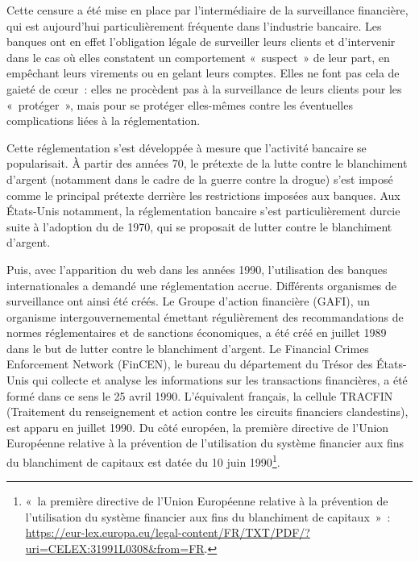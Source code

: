 Cette censure a été mise en place par l'intermédiaire de la surveillance financière, qui est aujourd'hui particulièrement fréquente dans l'industrie bancaire. Les banques ont en effet l'obligation légale de surveiller leurs clients et d'intervenir dans le cas où elles constatent un comportement «~suspect~» de leur part, en empêchant leurs virements ou en gelant leurs comptes. Elles ne font pas cela de gaieté de cœur~: elles ne procèdent pas à la surveillance de leurs clients pour les «~protéger~», mais pour se protéger elles-mêmes contre les éventuelles complications liées à la réglementation.

Cette réglementation s'est développée à mesure que l'activité bancaire se popularisait. À partir des années 70, le prétexte de la lutte contre le blanchiment d'argent (notamment dans le cadre de la guerre contre la drogue) s'est imposé comme le principal prétexte derrière les restrictions imposées aux banques. Aux États-Unis notamment, la réglementation bancaire s'est particulièrement durcie suite à l'adoption du  de 1970, qui se proposait de lutter contre le blanchiment d'argent.

Puis, avec l'apparition du web dans les années 1990, l'utilisation des banques internationales a demandé une réglementation accrue. Différents organismes de surveillance ont ainsi été créés. Le Groupe d'action financière (GAFI), un organisme intergouvernemental émettant régulièrement des recommandations de normes réglementaires et de sanctions économiques, a été créé en juillet 1989 dans le but de lutter contre le blanchiment d'argent. Le Financial Crimes Enforcement Network (FinCEN), le bureau du département du Trésor des États-Unis qui collecte et analyse les informations sur les transactions financières, a été formé dans ce sens le 25 avril 1990. L'équivalent français, la cellule TRACFIN (Traitement du renseignement et action contre les circuits financiers clandestins), est apparu en juillet 1990. Du côté européen, la première directive de l'Union Européenne relative à la prévention de l'utilisation du système financier aux fins du blanchiment de capitaux est datée du 10 juin 1990\footnote{«~la première directive de l'Union Européenne relative à la prévention de l'utilisation du système financier aux fins du blanchiment de capitaux~»~: \url{https://eur-lex.europa.eu/legal-content/FR/TXT/PDF/?uri=CELEX:31991L0308&from=FR}.}.

